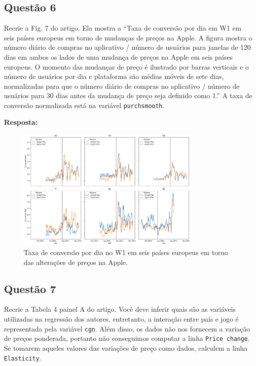 \newpage

\subsection{Questão 6}
Recrie a Fig. 7 do artigo. Ela mostra a “Taxa de conversão por dia em W1 em seis países europeus em torno de mudanças de preços na Apple. A figura mostra o número diário de compras no aplicativo / número de usuários para janelas de 120 dias em ambos os lados de uma mudança de preços na Apple em seis países europeus. O momento das mudanças de preço é ilustrado por barras verticais e o número de usuários por dia e plataforma são médias móveis de sete dias, normalizadas para que o número diário de compras no aplicativo / número de usuários para 30 dias antes da mudança de preço seja definido como 1.” A taxa de conversão normalizada está na variável \texttt{purchsmooth}.

\textbf{Resposta:} 

\begin{figure}[h!]
    \centering
    \caption{Taxa de conversão por dia no W1 em seis países europeus em torno das alterações de preços na Apple.}
    \includegraphics[width=0.8\textwidth]{Textuais/output fig7.png}
\end{figure}

\newpage

\subsection{Questão 7}
Recrie a Tabela 4 painel A do artigo. Você deve inferir quais são as variáveis utilizadas na regressão dos autores, entretanto, a interação entre país e jogo é representada pela variável \texttt{cgn}. Além disso, os dados não nos fornecem a variação de preços ponderada, portanto não conseguimos computar a linha \texttt{Price change}. Se tomarem aqueles valores das variações de preço como dados, calculem a linha \texttt{Elasticity}.

